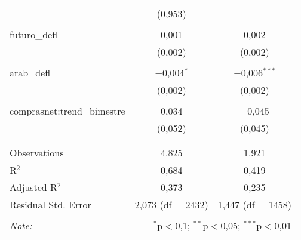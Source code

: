 \begin{table}[!htbp]
\begin{tabular}{@{\extracolsep{5pt}}lcc}
  & (0,953) &  \\ 
  & & \\ 
 futuro\_defl & 0,001 & 0,002 \\ 
  & (0,002) & (0,002) \\ 
  & & \\ 
 arab\_defl & $-$0,004$^{*}$ & $-$0,006$^{***}$ \\ 
  & (0,002) & (0,002) \\ 
  & & \\ 
 comprasnet:trend\_bimestre & 0,034 & $-$0,045 \\ 
  & (0,052) & (0,045) \\ 
  & & \\ 
\hline \\[-1.8ex] 
Observations & 4.825 & 1.921 \\ 
R$^{2}$ & 0,684 & 0,419 \\ 
Adjusted R$^{2}$ & 0,373 & 0,235 \\ 
Residual Std. Error & 2,073 (df = 2432) & 1,447 (df = 1458) \\ 
\hline 
\hline \\[-1.8ex] 
\textit{Note:}  & \multicolumn{2}{r}{$^{*}$p$<$0,1; $^{**}$p$<$0,05; $^{***}$p$<$0,01} \\ 
\end{tabular} 
\end{table} 
